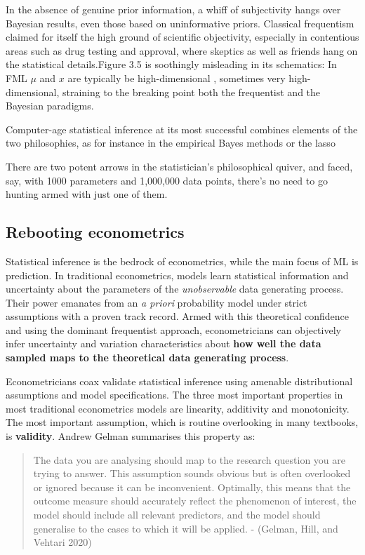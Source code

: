 \documentclass{article}
\begin{document}
In the absence of genuine prior information, a whiff of subjectivity
hangs over Bayesian results, even those based on uninformative priors.
Classical frequentism claimed for itself the high ground of scientific
objectivity, especially in contentious areas such as drug testing and
approval, where skeptics as well as friends hang on the statistical
details.Figure 3.5 is soothingly misleading in its schematics: In FML
\(\mu\) and \(x\) are typically be high-dimensional , sometimes very
high-dimensional, straining to the breaking point both the frequentist
and the Bayesian paradigms.

Computer-age statistical inference at its most successful combines
elements of the two philosophies, as for instance in the empirical Bayes
methods or the lasso

There are two potent arrows in the statistician's philosophical quiver,
and faced, say, with 1000 parameters and 1,000,000 data points, there's
no need to go hunting armed with just one of them.

\hypertarget{rebooting-econometrics}{%
\subsection{Rebooting econometrics}\label{rebooting-econometrics}}

Statistical inference is the bedrock of econometrics, while the main
focus of ML is prediction. In traditional econometrics, models learn
statistical information and uncertainty about the parameters of the
\emph{unobservable} data generating process. Their power emanates from
an \emph{a priori} probability model under strict assumptions with a
proven track record. Armed with this theoretical confidence and using
the dominant frequentist approach, econometricians can objectively infer
uncertainty and variation characteristics about \textbf{how well the
data sampled maps to the theoretical data generating process}.

Econometricians coax validate statistical inference using amenable
distributional assumptions and model specifications. The three most
important properties in most traditional econometrics models are
linearity, additivity and monotonicity. The most important assumption,
which is routine overlooking in many textbooks, is \textbf{validity}.
Andrew Gelman summarises this property as:

\begin{quote}
The data you are analysing should map to the research question you are
trying to answer. This assumption sounds obvious but is often overlooked
or ignored because it can be inconvenient. Optimally, this means that
the outcome measure should accurately reflect the phenomenon of
interest, the model should include all relevant predictors, and the
model should generalise to the cases to which it will be applied. -
(Gelman, Hill, and Vehtari 2020)
\end{quote}
\end{document}
